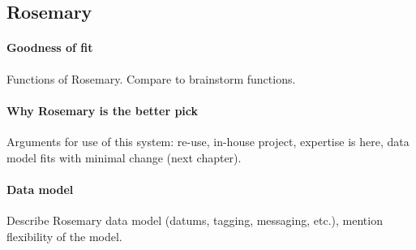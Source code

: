 \subsection{Rosemary}
\paragraph{Goodness of fit}
Functions of Rosemary.
Compare to brainstorm functions.
\paragraph{Why Rosemary is the better pick}
Arguments for use of this system: re-use, in-house project, expertise is here, data model fits with minimal change (next chapter).
\paragraph{Data model}
Describe Rosemary data model (datums, tagging, messaging, etc.), mention flexibility of the model.